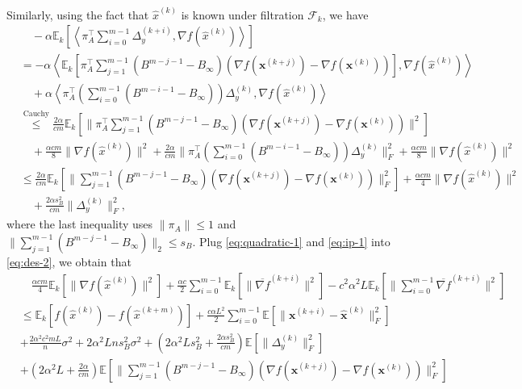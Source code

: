 \documentclass[10pt]{article}
\newcommand{\vx}{{\mathbf{x}}}
\newcommand{\cF}{{\mathcal{F}}}
\newcommand{\EE}{\mathbb{E}}
\newcommand{\norm}[1]{\| #1 \|}
\newcommand{\ip}[1]{\left\langle#1\right\rangle}
\begin{document}
Similarly, using the fact that $\hat{x}^{(k)}$ is known under filtration $\cF_k$, we have
\begin{align}\label{eq:ip-1}
    &\quad-\alpha \EE_k\left[\ip{\pi_A^\top \sum_{i=0}^{m-1}\Delta_y^{(k+i)},\nabla f(\hat{x}^{(k)})}\right]\\
    &=-\alpha \ip{\EE_k[\pi_A^\top\sum_{j=1}^{m-1}(B^{m-j-1}-B_\infty)(\nabla f(\vx^{(k+j)})-\nabla f(\vx^{(k)}))],\nabla f(\hat{x}^{(k)})}\nonumber\\
    &\quad+\alpha\ip{\pi_A^\top \left(\sum_{i=0}^{m-1}(B^{m-i-1}-B_\infty)\right)\Delta_y^{(k)},\nabla f(\hat{x}^{(k)})}\nonumber\\
    &\overset{\text{Cauchy}}{\le} \frac{2\alpha}{cm}\EE_k[\norm{\pi_A^\top \sum_{j=1}^{m-1}(B^{m-j-1}-B_\infty)(\nabla f(\vx^{(k+j)})-\nabla f(\vx^{(k)}))}^2]\\
    &\quad + \frac{\alpha cm}{8}\norm{\nabla f(\hat{x}^{(k)})}^2\nonumber +\frac{2\alpha}{cm}\norm{\pi_A^\top\left(\sum_{i=0}^{m-1}(B^{m-i-1}-B_\infty)\right)\Delta_y^{(k)}}_F^2  +\frac{\alpha cm}{8}\norm{\nabla f(\hat{x}^{(k)})}^2\nonumber\\
    &\le \frac{2\alpha}{cm}\EE_k[\norm{\sum_{j=1}^{m-1}(B^{m-j-1}-B_\infty)(\nabla f(\vx^{(k+j)})-\nabla f(\vx^{(k)}))}_F^2]+ \frac{\alpha cm}{4}\norm{\nabla f(\hat{x}^{(k)})}^2\nonumber\\
    &\quad +\frac{2\alpha s_B^2}{cm}\norm{\Delta_y^{(k)}}_F^2 \nonumber,
\end{align}
where the last inequality uses $\norm{\pi_A}\le 1$ and $\norm{\sum_{j=1}^{m-1}(B^{m-j-1}-B_\infty)}_2\le s_B$.
Plug \eqref{eq:quadratic-1} and \eqref{eq:ip-1} into \eqref{eq:des-2}, we obtain that
\begin{align}\label{eq:des-3}
    &\quad\frac{\alpha cm}{4}\EE_k[\norm{\nabla f(\hat{x}^{(k)})}^2]+\frac{\alpha c}{2}\sum_{i=0}^{m-1}\EE_k[\norm{\overline{\nabla f}^{(k+i)}}^2]-c^2\alpha^2L\EE_k[\norm{\sum_{i=0}^{m-1}\overline{\nabla f}^{(k+i)}}^2]\\
    &\le \EE_k[f(\hat{x}^{(k)})-f(\hat{x}^{(k+m)})]+\frac{c\alpha L^2}{2}\sum_{i=0}^{m-1}\EE[\norm{\vx^{(k+i)}-\hat{\vx}^{(k)}}_F^2]\nonumber\\
    &+\frac{2\alpha^2c^2mL}{n}\sigma^2+2\alpha^2Lns_B^2\sigma^2+(2\alpha^2Ls_B^2+\frac{2\alpha s_B^2}{cm})\EE[\norm{\Delta_y^{(k)}}_F^2]\nonumber\\
    &+(2\alpha^2L+\frac{2\alpha}{cm })\EE[\norm{\sum_{j=1}^{m-1}(B^{m-j-1}-B_\infty)(\nabla f(\vx^{(k+j)})-\nabla f(\vx^{(k)}))}_F^2]\nonumber
\end{align}
\end{document}
